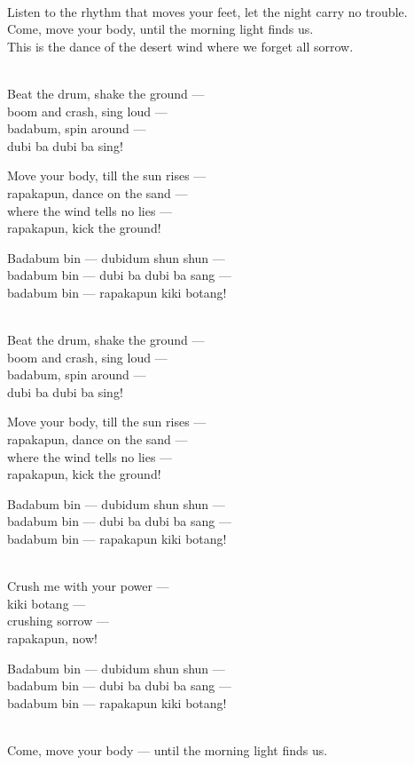 \begin{lyrics}
\\
Listen to the rhythm that moves your feet, let the night carry no trouble.\\
Come, move your body, until the morning light finds us.\\
This is the dance of the desert wind where we forget all sorrow.

\\
Beat the drum, shake the ground —\\
boom and crash, sing loud —\\
badabum, spin around —\\
dubi ba dubi ba sing!

Move your body, till the sun rises —\\
rapakapun, dance on the sand —\\
where the wind tells no lies —\\
rapakapun, kick the ground!

Badabum bin — dubidum shun shun —\\
badabum bin — dubi ba dubi ba sang —\\
badabum bin — rapakapun kiki botang!

\\
Beat the drum, shake the ground —\\
boom and crash, sing loud —\\
badabum, spin around —\\
dubi ba dubi ba sing!

Move your body, till the sun rises —\\
rapakapun, dance on the sand —\\
where the wind tells no lies —\\
rapakapun, kick the ground!

Badabum bin — dubidum shun shun —\\
badabum bin — dubi ba dubi ba sang —\\
badabum bin — rapakapun kiki botang!

\\
Crush me with your power —\\
kiki botang —\\
crushing sorrow —\\
rapakapun, now!

Badabum bin — dubidum shun shun —\\
badabum bin — dubi ba dubi ba sang —\\
badabum bin — rapakapun kiki botang!

\\
Come, move your body — until the morning light finds us.
\end{lyrics}

